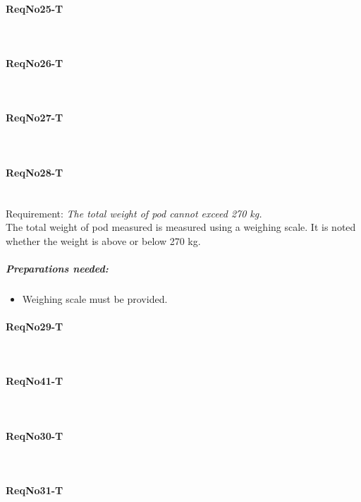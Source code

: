 \paragraph{ReqNo25-T}\mbox{}\\ %


\paragraph{ReqNo26-T}\mbox{}\\ %

\paragraph{ReqNo27-T}\mbox{}\\ %


\paragraph{ReqNo28-T}\mbox{}\\ %
Requirement: \textit{The total weight of pod cannot exceed 270 kg.}
\\
The total weight of pod measured is measured using a weighing scale. It is noted whether the weight is above or below 270 kg.
\\
	\subparagraph{Preparations needed:}
	\begin{itemize}
	\item Weighing scale must be provided.
	\end{itemize} 

\paragraph{ReqNo29-T}\mbox{}\\ %


\paragraph{ReqNo41-T}\mbox{}\\ %

\paragraph{ReqNo30-T}\mbox{}\\ %


\paragraph{ReqNo31-T}\mbox{}\\ %

